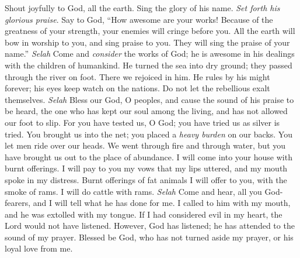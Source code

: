 \begin{biblechapter} %
 Shout joyfully to God, all the earth.
\verse Sing the glory of his name. 
\textit{Set forth his glorious praise}.
\verse Say to God, “How awesome are your works! 
Because of the greatness of your strength, 
your enemies will cringe before you.
\verse All the earth will bow in worship to you, 
and sing praise to you. 
They will sing the praise of your name.” \textit{Selah}
\verse Come and \textit{consider} the works of God; 
he is awesome in his dealings with the children of humankind.
\verse He turned the sea into dry ground; 
they passed through the river on foot. 
There we rejoiced in him.
\verse He rules by his might forever; 
his eyes keep watch on the nations. 
Do not let the rebellious exalt themselves. \textit{Selah}
\verse Bless our God, O peoples, 
and cause the sound of his praise to be heard,
\verse the one who has kept our soul among the living, 
and has not allowed our foot to slip.
\verse For you have tested us, O God; 
you have tried us as silver is tried.
\verse You brought us into the net; 
you placed a \textit{heavy burden} on our backs.
\verse You let men ride over our heads. 
We went through fire and through water, 
but you have brought us out to the place of abundance.
\verse I will come into your house with burnt offerings. 
I will pay to you my vows
\verse that my lips uttered, 
and my mouth spoke in my distress.
\verse Burnt offerings of fat animals I will offer to you, 
with the smoke of rams. 
I will do cattle with rams. \textit{Selah}
\verse Come and hear, all you God-fearers, and I will tell 
what he has done for me.
\verse I called to him with my mouth, 
and he was extolled with my tongue.
\verse If I had considered evil in my heart, 
the Lord would not have listened.
\verse However, God has listened; 
he has attended to the sound of my prayer.
\verse Blessed be God, 
who has not turned aside my prayer, 
or his loyal love from me.
\end{biblechapter}

